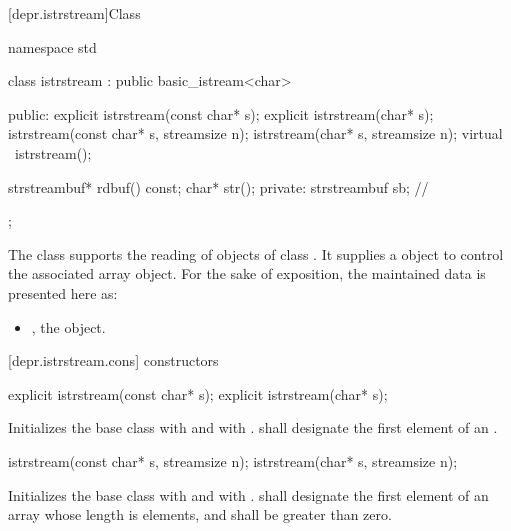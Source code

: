 [depr.istrstream]{Class }

%
\begin{codeblock}
namespace std {
  class istrstream : public basic_istream<char> {
  public:
    explicit istrstream(const char* s);
    explicit istrstream(char* s);
    istrstream(const char* s, streamsize n);
    istrstream(char* s, streamsize n);
    virtual ~istrstream();

    strstreambuf* rdbuf() const;
    char* str();
  private:
    strstreambuf sb;            // \expos
  };
}
\end{codeblock}

\pnum
The class
supports the reading of objects of class
.
It supplies a
object to control the associated array object.
For the sake of exposition, the maintained data is presented here as:

\begin{itemize}
\item
{}, the  object.
\end{itemize}

[depr.istrstream.cons]{ constructors}

%
\begin{itemdecl}
explicit istrstream(const char* s);
explicit istrstream(char* s);
\end{itemdecl}

\begin{itemdescr}
\pnum
\effects
Initializes the base class with  and
 with .
 shall designate the first element of an \ntbs{}.%
\end{itemdescr}

%
\begin{itemdecl}
istrstream(const char* s, streamsize n);
istrstream(char* s, streamsize n);
\end{itemdecl}

\begin{itemdescr}
\pnum
\effects
Initializes the base class with 
and  with .
 shall designate the first element of an array whose length is
 elements, and  shall be greater than zero.
\end{itemdescr}


